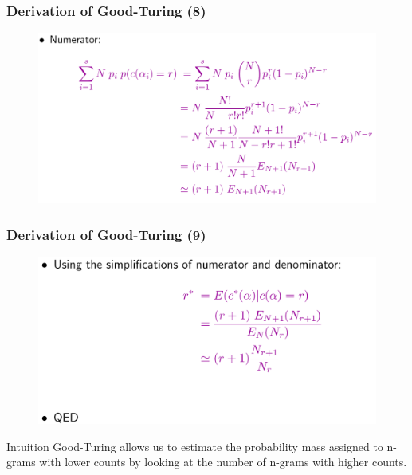 \documentclass{beamer}
\begin{document}
\begin{frame}\frametitle{Derivation of Good-Turing (8)}
\begin{figure}
\includegraphics[width=0.9\linewidth]{figure/derivation_good_turing_8.pdf}
\end{figure}
\end{frame}


\begin{frame}\frametitle{Derivation of Good-Turing (9)}
\begin{figure}
\includegraphics[width=0.8\linewidth]{figure/derivation_good_turing_9.pdf}
\end{figure}

\begin{block}{Intuition}
Good-Turing allows us to estimate the probability mass assigned to n-grams with lower counts by
looking at the number of n-grams with higher counts.  
\end{block}

\end{frame}





\end{document}
